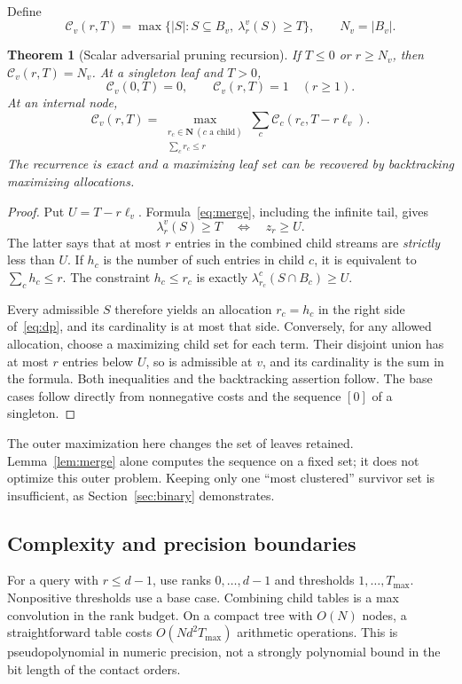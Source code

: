 \documentclass[11pt]{article}
\newtheorem{theorem}{Theorem}[section]
\theoremstyle{definition}
\newcommand{\N}{\mathbf N}
\newcommand{\capv}{\mathcal C}
\begin{document}
Define
\[
 \capv_v(r,T)=\max\{|S|:S\subseteq B_v,\ \lambda_r^v(S)\ge T\},
 \qquad N_v=|B_v|.
\]

\begin{theorem}[Scalar adversarial pruning recursion]\label{thm:dp}
If $T\le0$ or $r\ge N_v$, then $\capv_v(r,T)=N_v$. At a singleton leaf and $T>0$,
\[
 \capv_v(0,T)=0,\qquad \capv_v(r,T)=1\quad(r\ge1).
\]
At an internal node,
\begin{equation}\label{eq:dp}
 \boxed{\displaystyle
 \capv_v(r,T)=
 \max_{\substack{r_c\in\N\ (c\text{ a child})\\\sum_c r_c\le r}}
 \sum_c\capv_c(r_c,T-r\ell_v).}
\end{equation}
The recurrence is exact and a maximizing leaf set can be recovered by backtracking maximizing allocations.
\end{theorem}

\begin{proof}
Put $U=T-r\ell_v$. Formula~\eqref{eq:merge}, including the infinite tail, gives
\[
 \lambda_r^v(S)\ge T
 \quad\Longleftrightarrow\quad z_r\ge U.
\]
The latter says that at most $r$ entries in the combined child streams are \emph{strictly} less than $U$. If $h_c$ is the number of such entries in child $c$, it is equivalent to $\sum_c h_c\le r$. The constraint $h_c\le r_c$ is exactly $\lambda_{r_c}^c(S\cap B_c)\ge U$.

Every admissible $S$ therefore yields an allocation $r_c=h_c$ in the right side of~\eqref{eq:dp}, and its cardinality is at most that side. Conversely, for any allowed allocation, choose a maximizing child set for each term. Their disjoint union has at most $r$ entries below $U$, so is admissible at $v$, and its cardinality is the sum in the formula. Both inequalities and the backtracking assertion follow. The base cases follow directly from nonnegative costs and the sequence $[0]$ of a singleton.
\end{proof}

The outer maximization here changes the set of leaves retained. Lemma~\ref{lem:merge} alone computes the sequence on a fixed set; it does not optimize this outer problem. Keeping only one ``most clustered'' survivor set is insufficient, as Section~\ref{sec:binary} demonstrates.

\subsection{Complexity and precision boundaries}

For a query with $r\le d-1$, use ranks $0,\ldots,d-1$ and thresholds $1,\ldots,T_{\max}$. Nonpositive thresholds use a base case. Combining child tables is a max convolution in the rank budget. On a compact tree with $O(N)$ nodes, a straightforward table costs $O(Nd^2T_{\max})$ arithmetic operations. This is pseudopolynomial in numeric precision, not a strongly polynomial bound in the bit length of the contact orders.
\end{document}

